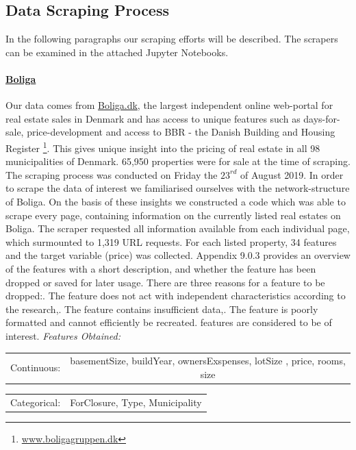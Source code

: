 \documentclass[12pt,a4paper]{article}
\begin{document}
\subsection{Data Scraping Process}
In the following paragraphs our scraping efforts will be described. The scrapers can be examined in the attached Jupyter Notebooks. 
\paragraph{\href{https://www.boliga.dk}{Boliga}\newline}
Our data comes from \href{https://www.boliga.dk}{Boliga.dk}, the largest independent online web-portal for real estate sales in Denmark and has access to unique features such as days-for-sale, price-development and access to BBR - the Danish Building and Housing Register \footnote{\href{https://www.boligagruppen.dk}{www.boligagruppen.dk}}. This gives unique insight into the pricing of real estate in all 98 municipalities of Denmark. 65,950 properties were for sale at the time of scraping.\newline
The scraping process was conducted on Friday the $23^{rd}$ of August 2019. In order to scrape the data of interest we familiarised ourselves with the network-structure of Boliga. On the basis of these insights we constructed a code which was able to scrape every page, containing information on the currently listed real estates on Boliga. The scraper requested all information available from each individual page, which surmounted to 1,319 URL requests. \newline
For each listed property, 34 features and the target variable (price) was collected. Appendix 9.0.3 provides an overview of the features with a short description, and whether the feature has been dropped or saved for later usage. There are three reasons for a feature to be dropped:. The feature does not act with independent characteristics according to the research,. The feature contains insufficient data,. The feature is poorly formatted and cannot efficiently be recreated.  features are considered to be of interest.
\vspace*{10px} \newline
\textit{Features Obtained:} \newline
\begin{tabular}{c c}
Continuous: & basementSize, buildYear, ownersExspenses, lotSize	, price, rooms, size  \\	
\end{tabular}\newline 
\begin{tabular}{c c}
Categorical: & ForClosure, Type, Municipality	 \\	
\end{tabular}
\end{document}
